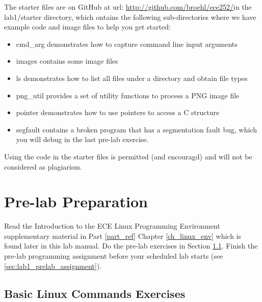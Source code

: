 The starter files are on GitHub at url: \url{http://github.com/broehl/ece252/}in the lab1/starter directory, which ontains the following sub-directories where we have example code and image files to help you get started:
\begin{itemize}
    \item {cmd\_arg} demonstrates how to capture command line input arguments
    \item {images} contains some image files
    \item {ls} demonstrates how to list all files under a directory and obtain file types
    \item {png\_util} provides a set of utility functions to process a PNG image file
    \item {pointer} demonstrates how to use pointers to access a C structure
    \item {segfault} contains a broken program that has a segmentation fault bug, which you will debug in the last pre-lab exercise.
\end{itemize}
Using the code in the starter files is permitted (and encouragd) and will not be considered as plagiarism.

\section{Pre-lab Preparation}

Read the Introduction to the ECE Linux Programming Environment supplementary material in Part \ref{part_ref} Chapter \ref{ch_linux_env} which is found later in this lab manual. Do the pre-lab exercises in Section \ref{sec_ex1}. Finish the pre-lab programming assignment before your scheduled lab starts (see \ref{sec:lab1_prelab_assignment}).
\subsection{Basic Linux Commands Exercises}
\label{sec_ex1}

